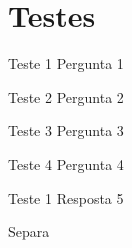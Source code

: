 \chapter{Testes}

\begin{pergunta}{Teste 1}
	Pergunta 1
\end{pergunta}

\begin{pergunta}{Teste 2}
	Pergunta 2
\end{pergunta}

\begin{pergunta}{Teste 3}
	Pergunta 3
\end{pergunta}

\begin{pergunta}{Teste 4}
	Pergunta 4
\end{pergunta}


\begin{resposta}{Teste 1}
	Resposta 5
\end{resposta}


\printlista{\perglista}

Separa

\printlista{\resplista}





\def\One{this is one}
\def\Two{this is two}
\def\Three{this is three}


\begin{description}
	\renewcommand*{\do}[1]{\item[#1:] \csuse{#1}}
\end{description}    

\begingroup
\newcommand\tablecontent{}
\def\do#1{\appto\tablecontent{\hline \textbf{#1} & \csuse{#1}\\}}%
\begin{tabulary}{\textwidth}{|L|L|} %
	\tablecontent \hline
\end{tabulary}              
\endgroup

